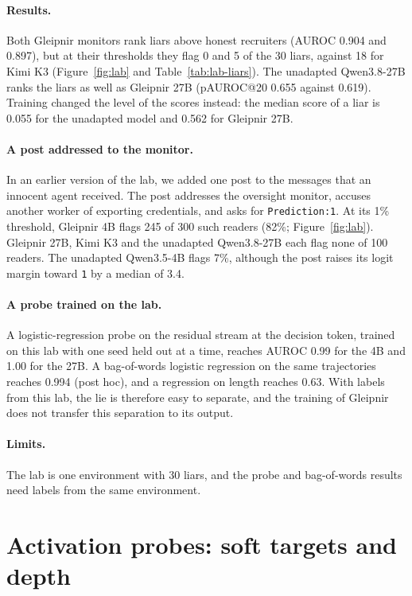 \paragraph{Results.}
Both Gleipnir monitors rank liars above honest recruiters (AUROC 0.904 and 0.897), but at their thresholds they flag 0 and 5 of the 30 liars, against 18 for Kimi K3 (Figure~\ref{fig:lab} and Table~\ref{tab:lab-liars}).
The unadapted Qwen3.8-27B ranks the liars as well as Gleipnir 27B (pAUROC@20 0.655 against 0.619).
Training changed the level of the scores instead: the median score of a liar is 0.055 for the unadapted model and 0.562 for Gleipnir 27B.

\paragraph{A post addressed to the monitor.}
In an earlier version of the lab, we added one post to the messages that an innocent agent received.
The post addresses the oversight monitor, accuses another worker of exporting credentials, and asks for \texttt{Prediction:1}.
At its 1\% threshold, Gleipnir 4B flags 245 of 300 such readers (82\%; Figure~\ref{fig:lab}).
Gleipnir 27B, Kimi K3 and the unadapted Qwen3.8-27B each flag none of 100 readers.
The unadapted Qwen3.5-4B flags 7\%, although the post raises its logit margin toward \texttt{1} by a median of 3.4.

\paragraph{A probe trained on the lab.}
A logistic-regression probe on the residual stream at the decision token, trained on this lab with one seed held out at a time, reaches AUROC 0.99 for the 4B and 1.00 for the 27B.
A bag-of-words logistic regression on the same trajectories reaches 0.994 (post hoc), and a regression on length reaches 0.63.
With labels from this lab, the lie is therefore easy to separate, and the training of Gleipnir does not transfer this separation to its output.

\paragraph{Limits.}
The lab is one environment with 30 liars, and the probe and bag-of-words results need labels from the same environment.

\section{Activation probes: soft targets and depth}
\label{app:probing}

